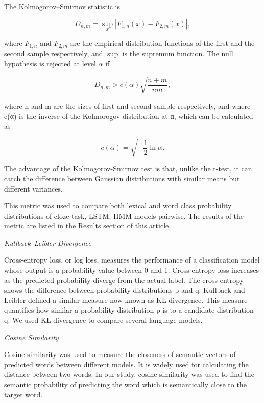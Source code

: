 \documentclass[a4paper]{article}
\newcommand{\head}[1]{\vspace{0.5em}\emph{#1}\vspace{0.25em}}
\begin{document}
The Kolmogorov–Smirnov statistic is 

\[ {D_{n,m}=\sup _{x}|F_{1,n}(x)-F_{2,m}(x)|,} \]


where \({F_{1,n}}\) and  \({F_{2,m}}\) are the empirical distribution
functions of the first and the second sample respectively, and
\({\sup}\)
is the supremum function. The null hypothesis is rejected at level
\({\alpha }\) if 

\[ {D_{n,m}>c(\alpha ){\sqrt {\frac {n+m}{nm}}},} \]

where {n} and {m} are the sizes of first and second sample respectively, and where c(α) is the inverse of the Kolmorogov distribution at α, which can be calculated as 


\[ { c\left(\alpha \right)={\sqrt {-{\frac {1}{2}}\ln \alpha }}.} \]

The advantage of the Kolmogorov-Smirnov test is that, unlike the t-test, it can catch the difference between Gaussian distributions with similar means but different variances.

This metric was used to compare both lexical and word class probability distributions of cloze task, LSTM, HMM models pairwise. The results of the metric are listed in the Results section of this article.

\head{Kullback–Leibler Divergence}

Cross-entropy loss, or log loss, measures the performance of a classification model whose output is a probability value between 0 and 1. Cross-entropy loss increases as the predicted probability diverge from the actual label. The cross-entropy shows the difference between probability distributions p and q. Kullback and Leibler defined a similar measure now known as KL divergence. This measure quantifies how similar a probability distribution p is to a candidate distribution q. We used KL-divergence to compare several language models.

\head{Cosine Similarity}

Cosine similarity was used to measure the closeness of semantic vectors of predicted words between different models. It is widely used for calculating the distance between two words. In our study, cosine similarity was used to find the semantic probability of predicting the word which is semantically close to the target word. 
%
%
%
%
%
\end{document}
